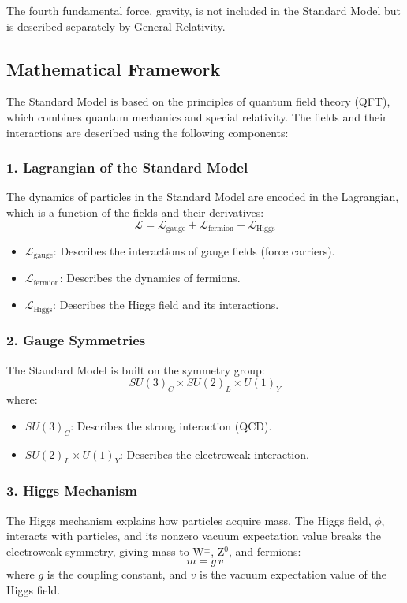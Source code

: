 The fourth fundamental force, gravity, is not included in the Standard Model but is described separately by General Relativity.


\subsection{Mathematical Framework}
The Standard Model is based on the principles of quantum field theory (QFT), which combines quantum mechanics and special relativity. The fields and their interactions are described using the following components:

\subsubsection{1. Lagrangian of the Standard Model}
The dynamics of particles in the Standard Model are encoded in the Lagrangian, which is a function of the fields and their derivatives:
\[
\mathcal{L} = \mathcal{L}_{\text{gauge}} + \mathcal{L}_{\text{fermion}} + \mathcal{L}_{\text{Higgs}}
\]
\begin{itemize}
    \item $\mathcal{L}_{\text{gauge}}$: Describes the interactions of gauge fields (force carriers).
    \item $\mathcal{L}_{\text{fermion}}$: Describes the dynamics of fermions.
    \item $\mathcal{L}_{\text{Higgs}}$: Describes the Higgs field and its interactions.
\end{itemize}

\subsubsection{2. Gauge Symmetries}
The Standard Model is built on the symmetry group:
\[
SU(3)_C \times SU(2)_L \times U(1)_Y
\]
where:
\begin{itemize}
    \item $SU(3)_C$: Describes the strong interaction (QCD).
    \item $SU(2)_L \times U(1)_Y$: Describes the electroweak interaction.
\end{itemize}

\subsubsection{3. Higgs Mechanism}
The Higgs mechanism explains how particles acquire mass. The Higgs field, $\phi$, interacts with particles, and its nonzero vacuum expectation value breaks the electroweak symmetry, giving mass to W$^\pm$, Z$^0$, and fermions:
\[
m = g \, v
\]
where $g$ is the coupling constant, and $v$ is the vacuum expectation value of the Higgs field.


